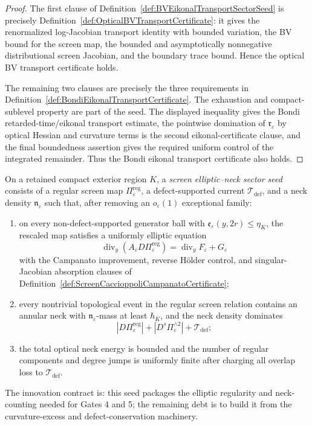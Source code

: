 \begin{proof}
The first clause of Definition~\ref{def:BVEikonalTransportSectorSeed} is precisely Definition~\ref{def:OpticalBVTransportCertificate}: it gives the renormalized log-Jacobian transport identity with bounded variation, the BV bound for the screen map, the bounded and asymptotically nonnegative distributional screen Jacobian, and the boundary trace bound. Hence the optical BV transport certificate holds.

The remaining two clauses are precisely the three requirements in Definition~\ref{def:BondiEikonalTransportCertificate}. The exhaustion and compact-sublevel property are part of the seed. The displayed inequality gives the Bondi retarded-time/eikonal transport estimate, the pointwise domination of $\mathfrak r_\varepsilon$ by optical Hessian and curvature terms is the second eikonal-certificate clause, and the final boundedness assertion gives the required uniform control of the integrated remainder. Thus the Bondi eikonal transport certificate also holds.
\end{proof}

\begin{definition}\label{def:ScreenEllipticNeckSectorSeed}
On a retained compact exterior region $K$, a \emph{screen elliptic--neck sector seed} consists of a regular screen map $\Pi_\varepsilon^{\mathrm{reg}}$, a defect-supported current $\mathcal T_{\mathrm{def}}$, and a neck density $\mathfrak n_\varepsilon$ such that, after removing an $o_\varepsilon(1)$ exceptional family:
\begin{enumerate}
    \item on every non-defect-supported generator ball with $\mathfrak e_\varepsilon(y,2r)\le\eta_K$, the rescaled map satisfies a uniformly elliptic equation
    \[
        \operatorname{div}_y(A_\varepsilon D\Pi_\varepsilon^{\mathrm{reg}})
        =
        \operatorname{div}_yF_\varepsilon+G_\varepsilon
    \]
    with the Campanato improvement, reverse H\"older control, and singular-Jacobian absorption clauses of Definition~\ref{def:ScreenCaccioppoliCampanatoCertificate};
    \item every nontrivial topological event in the regular screen relation contains an annular neck with $\mathfrak n_\varepsilon$-mass at least $\hbar_K$, and the neck density dominates
    \[
        |D\Pi_\varepsilon^{\mathrm{reg}}|
        +
        |D^s\Pi_\varepsilon^{\wedge2}|
        +
        \mathcal T_{\mathrm{def}};
    \]
    \item the total optical neck energy is bounded and the number of regular components and degree jumps is uniformly finite after charging all overlap loss to $\mathcal T_{\mathrm{def}}$.
\end{enumerate}
The innovation contract is: this seed packages the elliptic regularity and neck-counting needed for Gates 4 and 5; the remaining debt is to build it from the curvature-excess and defect-conservation machinery.
\end{definition}


